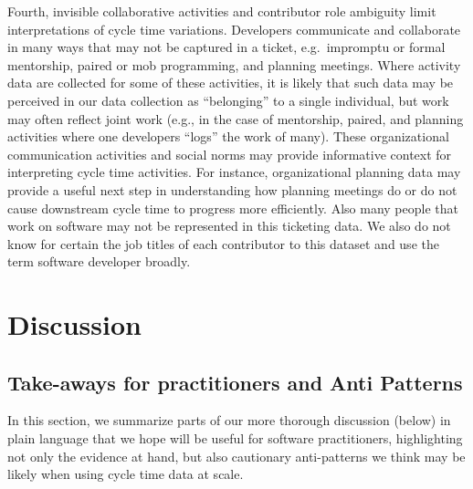 \documentclass[
  sn-mathphys-ay,
]{sn-jnl}
\begin{document}
Fourth, invisible collaborative activities and contributor role
ambiguity limit interpretations of cycle time variations. Developers
communicate and collaborate in many ways that may not be captured in a
ticket, e.g.~impromptu or formal mentorship, paired or mob programming,
and planning meetings. Where activity data are collected for some of
these activities, it is likely that such data may be perceived in our
data collection as ``belonging'' to a single individual, but work may
often reflect joint work (e.g., in the case of mentorship, paired, and
planning activities where one developers ``logs'' the work of many).
These organizational communication activities and social norms may
provide informative context for interpreting cycle time activities. For
instance, organizational planning data may provide a useful next step in
understanding how planning meetings do or do not cause downstream cycle
time to progress more efficiently. Also many people that work on
software may not be represented in this ticketing data. We also do not
know for certain the job titles of each contributor to this dataset and
use the term software developer broadly.

\section{Discussion}\label{discussion}

\subsection{Take-aways for practitioners and Anti
Patterns}\label{take-aways-for-practitioners-and-anti-patterns}

In this section, we summarize parts of our more thorough discussion
(below) in plain language that we hope will be useful for software
practitioners, highlighting not only the evidence at hand, but also
cautionary anti-patterns we think may be likely when using cycle time
data at scale.
\end{document}
